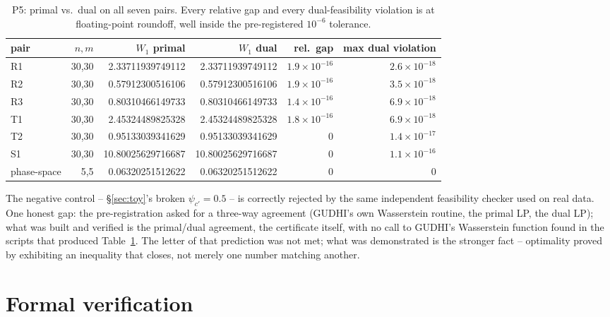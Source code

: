 \documentclass[11pt,a4paper]{article}
\begin{document}
\begin{table}[h]\centering\small
\begin{tabular}{@{}lrrrrr@{}}
\toprule
pair & $n,m$ & $W_1$ primal & $W_1$ dual & rel.\ gap & max dual violation \\
\midrule
R1 & 30,30 & 2.33711939749112 & 2.33711939749112 & $1.9\times10^{-16}$ & $2.6\times10^{-18}$ \\
R2 & 30,30 & 0.57912300516106 & 0.57912300516106 & $1.9\times10^{-16}$ & $3.5\times10^{-18}$ \\
R3 & 30,30 & 0.80310466149733 & 0.80310466149733 & $1.4\times10^{-16}$ & $6.9\times10^{-18}$ \\
T1 & 30,30 & 2.45324489825328 & 2.45324489825328 & $1.8\times10^{-16}$ & $6.9\times10^{-18}$ \\
T2 & 30,30 & 0.95133039341629 & 0.95133039341629 & 0 & $1.4\times10^{-17}$ \\
S1 & 30,30 & 10.80025629716687 & 10.80025629716687 & 0 & $1.1\times10^{-16}$ \\
phase-space & 5,5 & 0.06320251512622 & 0.06320251512622 & 0 & 0 \\
\bottomrule
\end{tabular}
\caption{P5: primal vs.\ dual on all seven pairs. Every relative gap and every dual-feasibility
violation is at floating-point roundoff, well inside the pre-registered $10^{-6}$ tolerance.}
\label{tab:certificates}
\end{table}

The negative control -- \S\ref{sec:toy}'s broken $\psi_{c'}=0.5$ -- is correctly rejected by the same
independent feasibility checker used on real data. One honest gap: the pre-registration asked for a
three-way agreement (GUDHI's own Wasserstein routine, the primal LP, the dual LP); what was built and
verified is the primal/dual agreement, the certificate itself, with no call to GUDHI's Wasserstein
function found in the scripts that produced Table~\ref{tab:certificates}. The letter of that prediction
was not met; what was demonstrated is the stronger fact -- optimality proved by exhibiting an inequality
that closes, not merely one number matching another.

\section{Formal verification}
\label{sec:lean}
\end{document}
